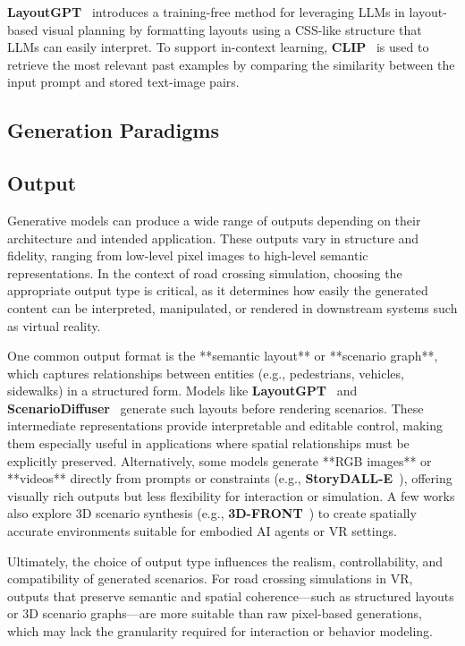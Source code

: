 \documentclass{article}
\begin{document}
\textbf{LayoutGPT}~\cite{feng2023layoutgpt} introduces a training-free method for leveraging LLMs in layout-based visual planning by formatting layouts using a CSS-like structure that LLMs can easily interpret. To support in-context learning, \textbf{CLIP}~\cite{radford2021learning} is used to retrieve the most relevant past examples by comparing the similarity between the input prompt and stored text-image pairs.

\subsection{Generation Paradigms}


\subsection{Output}

Generative models can produce a wide range of outputs depending on their architecture and intended application. These outputs vary in structure and fidelity, ranging from low-level pixel images to high-level semantic representations. In the context of road crossing simulation, choosing the appropriate output type is critical, as it determines how easily the generated content can be interpreted, manipulated, or rendered in downstream systems such as virtual reality.

One common output format is the **semantic layout** or **scenario graph**, which captures relationships between entities (e.g., pedestrians, vehicles, sidewalks) in a structured form. Models like \textbf{LayoutGPT}~\cite{feng2023layoutgpt} and \textbf{ScenarioDiffuser}~\cite{yang2023scenariodiffuser} generate such layouts before rendering scenarios. These intermediate representations provide interpretable and editable control, making them especially useful in applications where spatial relationships must be explicitly preserved. Alternatively, some models generate **RGB images** or **videos** directly from prompts or constraints (e.g., \textbf{StoryDALL-E}~\cite{storydalle}), offering visually rich outputs but less flexibility for interaction or simulation. A few works also explore 3D scenario synthesis (e.g., \textbf{3D-FRONT}~\cite{fu20213dfront}) to create spatially accurate environments suitable for embodied AI agents or VR settings.

Ultimately, the choice of output type influences the realism, controllability, and compatibility of generated scenarios. For road crossing simulations in VR, outputs that preserve semantic and spatial coherence—such as structured layouts or 3D scenario graphs—are more suitable than raw pixel-based generations, which may lack the granularity required for interaction or behavior modeling.
\end{document}
